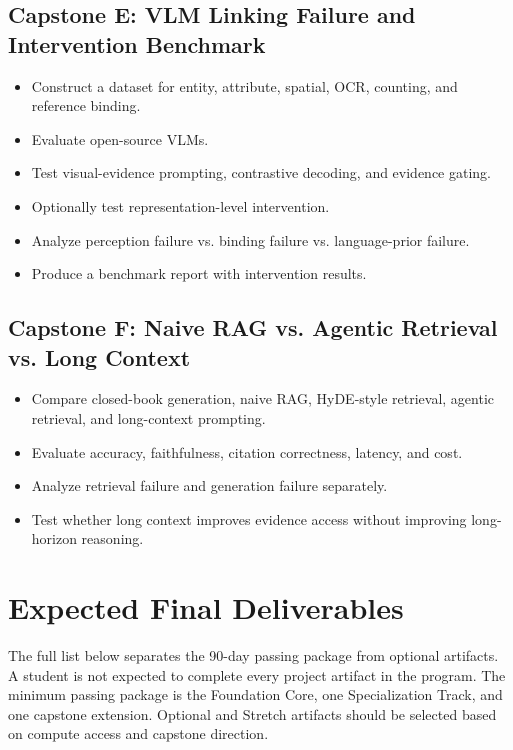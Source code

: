 \documentclass[11pt]{article}
\begin{document}
\subsection*{Capstone E: VLM Linking Failure and Intervention Benchmark}

\begin{itemize}
    \item Construct a dataset for entity, attribute, spatial, OCR, counting, and reference binding.
    \item Evaluate open-source VLMs.
    \item Test visual-evidence prompting, contrastive decoding, and evidence gating.
    \item Optionally test representation-level intervention.
    \item Analyze perception failure vs. binding failure vs. language-prior failure.
    \item Produce a benchmark report with intervention results.
\end{itemize}

\subsection*{Capstone F: Naive RAG vs. Agentic Retrieval vs. Long Context}

\begin{itemize}
    \item Compare closed-book generation, naive RAG, HyDE-style retrieval, agentic retrieval, and long-context prompting.
    \item Evaluate accuracy, faithfulness, citation correctness, latency, and cost.
    \item Analyze retrieval failure and generation failure separately.
    \item Test whether long context improves evidence access without improving long-horizon reasoning.
\end{itemize}

\section*{Expected Final Deliverables}

The full list below separates the 90-day passing package from optional artifacts. A student is not expected to complete every project artifact in the program. The minimum passing package is the Foundation Core, one Specialization Track, and one capstone extension. Optional and Stretch artifacts should be selected based on compute access and capstone direction.
\end{document}
